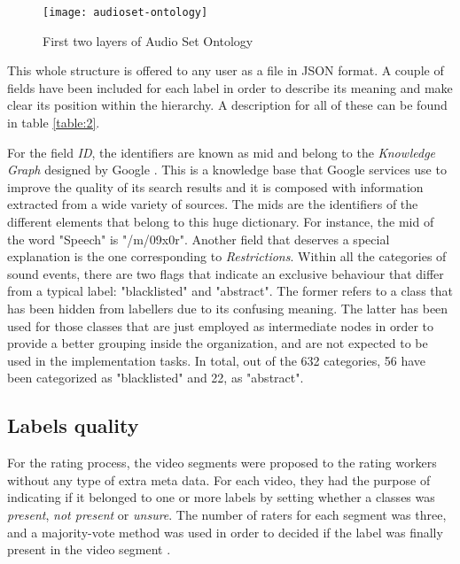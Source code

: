	\begin{figure}[h]
		\centering
		\captionsetup{justification=centering}
		\texttt{[image: audioset-ontology]}
		\caption{First two layers of Audio Set Ontology \cite{Gemmeke2017}}
		\label{fig:mesh1}
	\end{figure}
	
	This whole structure is offered to any user as a file in JSON format. A couple of fields have been included for each label in order to describe its meaning and make clear its position within the hierarchy. A description for all of these can be found in table \ref{table:2}. 
	
	
	
	For the field \textit{ID}, the identifiers are known as \acrfull{mid} and belong to the \textit{Knowledge Graph} designed by Google \cite{Singhal2012}. This is a knowledge base that Google services use to improve the quality of its search results and it is composed with information extracted from a wide variety of sources. The \acrshort{mid}s are the identifiers of the different elements that belong to this huge dictionary. For instance, the \acrshort{mid} of the word "Speech" is "/m/09x0r". Another field that deserves a special explanation is the one corresponding to \textit{Restrictions}. Within all the categories of sound events, there are two flags that indicate an exclusive behaviour that differ from a typical label: "blacklisted" and "abstract". The former refers to a class that has been hidden from labellers due to its confusing meaning. The latter has been used for those classes that are just employed as intermediate nodes in order to provide a better grouping inside the organization, and are not expected to be used in the implementation tasks. In total, out of the 632 categories, 56 have been categorized as "blacklisted" and 22, as "abstract".
	
\subsection{Labels quality}
\label{subsection:labels-quality}
	
	For the rating process, the video segments were proposed to the rating workers without any type of extra meta data. For each video, they had the purpose of indicating if it belonged to one or more labels by setting whether a classes was \textit{present}, \textit{not present} or \textit{unsure}. The number of raters for each segment was three, and a majority-vote method was used in order to decided if the label was finally present in the video segment \cite{Gemmeke2017}.
	
